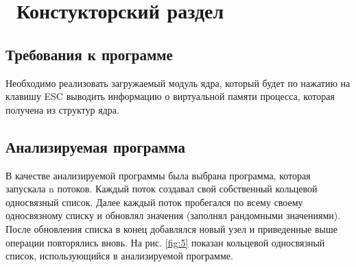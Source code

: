 \chapter{ Констукторский раздел}
\label{cha:design}




\section{Требования к программе}

Необходимо реализовать загружаемый модуль ядра, который будет 
по нажатию на клавишу ESC выводить информацию о виртуальной памяти процесса, которая
получена из структур ядра.



\section{Анализируемая программа}

В качестве анализируемой программы  была выбрана программа, 
которая запускала n потоков. 
Каждый поток создавал свой собственный кольцевой односвязный список.
Далее каждый поток пробегался по всему своему односвязному списку 
и обновлял значения (заполнял рандомными значениями).
После обновления списка в конец добавлялся новый узел 
и приведенные выше операции повторялись вновь. 
На рис. \ref{fig:5} показан кольцевой односвязный список, использующийся в анализируемой программе.

\begin{figure}[ht!]
\end{figure}

